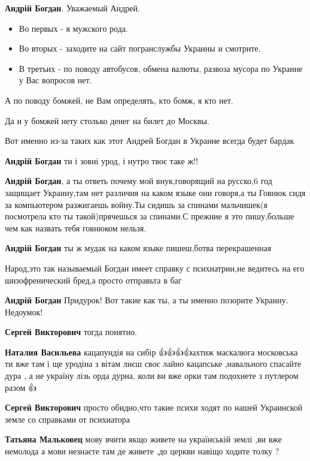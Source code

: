 \begin{itemize}
\begin{itemize}
\textbf{Андрій Богдан}. Уважаемый Андрей.

\begin{itemize}
  \item Во первых - я мужского рода.
  \item Во вторых - заходите на сайт погранслужбы Украины и смотрите.
  \item В третьих - по поводу автобусов, обмена валюты, развоза мусора по Украине у Вас вопросов нет.
\end{itemize}

А по поводу бомжей, не Вам определять, кто бомж, я кто нет.

Да и у бомжей нету столько денег на билет до Москвы.

Вот именно из-за таких как этот Андрей Богдан в Украине всегда будет бардак

\textbf{Андрій Богдан} ти і зовні урод, і нутро твоє таке ж!!

\textbf{Андрій Богдан}, а ты ответь почему мой внук,говорящий на русско,6 год
защищает Украину,там нет различия на каком языке они говоря,а ты Говнюк сидя за
компьютером разжигаешь войну.Ты сидишь за спинами мальчишек(я посмотрела кто ты
такой)прячешься за спинами.С прежние я это пишу,больше чем как назвать тебя
говнюком нельзя.

\textbf{Андрій Богдан} ты ж мудак на каком языке пишеш,ботва перекрашенная

Народ,это так называемый Богдан имеет справку с психиатрии,не ведитесь на его
шизофренический бред,а просто отправьта в баг

\textbf{Андрій Богдан} Придурок! Вот такие как ты, а ты именно позорите Украину. Недоумок!

\textbf{Сергей Викторович} тогда понятно.

\textbf{Наталия Васильева} кацапундія на сибір \Laughey[1.0]\Laughey[1.0]\Laughey[1.0]👍👍👍👍ахтиж маскалюга
московська ти вже там і ще уродіна з вітам лиєш своє лайно кацапське
,навального спасайте дура , а не україну лізь орда дурна, коли ви вже орки там
подохнете з путлером разом \Laughey[1.0]\Laughey[1.0]\Laughey[1.0]👍

\textbf{Сергей Викторович} просто обидно,что такие психи ходят по нашей Украинской земле со справками от психиатора

\textbf{Татьяна Мальковец} мову вчити якщо живете на українській землі ,ви вже немолода а мови незнаєте там де живете ,до церкви навіщо ходите толку ?


\end{itemize}
\end{itemize}
